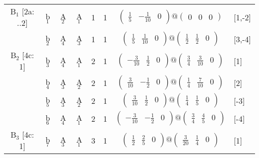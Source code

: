 \documentclass[fleqn,10pt,landscape]{article}
\begin{document}
\begin{itemize}
\begin{center}
\begin{longtable}{cc|cc|c|c|c|l}
B$_{1}$ [2a: ..2] & b$_{1}$ & A$_{2}$ & A$_{1}$ & 1 & 1 & $\begin{pmatrix} \frac{1}{5} & - \frac{1}{10} & 0 \end{pmatrix}@\begin{pmatrix} 0 & 0 & 0 \end{pmatrix}$ & [1,-2] \\
& b$_{2}$ & A$_{4}$ & A$_{3}$ & 1 & 1 & $\begin{pmatrix} \frac{1}{5} & \frac{1}{10} & 0 \end{pmatrix}@\begin{pmatrix} \frac{1}{2} & \frac{1}{2} & 0 \end{pmatrix}$ & [3,-4] \\ \hline
B$_{2}$ [4c: 1] & b$_{3}$ & A$_{4}$ & A$_{1}$ & 2 & 1 & $\begin{pmatrix} - \frac{3}{10} & \frac{1}{2} & 0 \end{pmatrix}@\begin{pmatrix} \frac{3}{4} & \frac{3}{10} & 0 \end{pmatrix}$ & [1] \\
& b$_{4}$ & A$_{3}$ & A$_{2}$ & 2 & 1 & $\begin{pmatrix} \frac{3}{10} & - \frac{1}{2} & 0 \end{pmatrix}@\begin{pmatrix} \frac{1}{4} & \frac{7}{10} & 0 \end{pmatrix}$ & [2] \\
& b$_{5}$ & A$_{3}$ & A$_{2}$ & 2 & 1 & $\begin{pmatrix} \frac{3}{10} & \frac{1}{2} & 0 \end{pmatrix}@\begin{pmatrix} \frac{1}{4} & \frac{1}{5} & 0 \end{pmatrix}$ & [-3] \\
& b$_{6}$ & A$_{4}$ & A$_{1}$ & 2 & 1 & $\begin{pmatrix} - \frac{3}{10} & - \frac{1}{2} & 0 \end{pmatrix}@\begin{pmatrix} \frac{3}{4} & \frac{4}{5} & 0 \end{pmatrix}$ & [-4] \\ \hline
B$_{3}$ [4c: 1] & b$_{7}$ & A$_{3}$ & A$_{1}$ & 3 & 1 & $\begin{pmatrix} \frac{1}{2} & \frac{2}{5} & 0 \end{pmatrix}@\begin{pmatrix} \frac{3}{20} & \frac{1}{4} & 0 \end{pmatrix}$ & [1] \\

\end{longtable}
\end{center}
\end{itemize}
\end{document}
